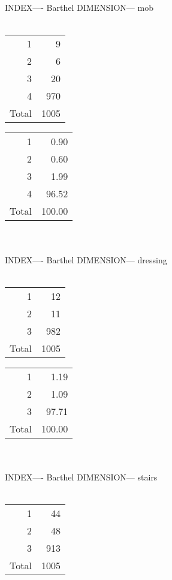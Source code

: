 \documentclass[11pt]{article}
\begin{document}
\\\\ 
INDEX---- Barthel DIMENSION--- mob 
 \\\\ 
% 
\begin{tabular}{rr}
   \hline
1 &   9 \\ 
  2 &   6 \\ 
  3 &  20 \\ 
  4 & 970 \\ 
  Total & 1005 \\ 
   \hline
\end{tabular}
% 
\begin{tabular}{rr}
   \hline
1 & 0.90 \\ 
  2 & 0.60 \\ 
  3 & 1.99 \\ 
  4 & 96.52 \\ 
  Total & 100.00 \\ 
   \hline
\end{tabular}
\\\\ 
INDEX---- Barthel DIMENSION--- dressing 
 \\\\ 
% 
\begin{tabular}{rr}
   \hline
1 &  12 \\ 
  2 &  11 \\ 
  3 & 982 \\ 
  Total & 1005 \\ 
   \hline
\end{tabular}
% 
\begin{tabular}{rr}
   \hline
1 & 1.19 \\ 
  2 & 1.09 \\ 
  3 & 97.71 \\ 
  Total & 100.00 \\ 
   \hline
\end{tabular}
\\\\ 
INDEX---- Barthel DIMENSION--- stairs 
 \\\\ 
% 
\begin{tabular}{rr}
   \hline
1 &  44 \\ 
  2 &  48 \\ 
  3 & 913 \\ 
  Total & 1005 \\ 
   \hline
\end{tabular}
\end{document}
